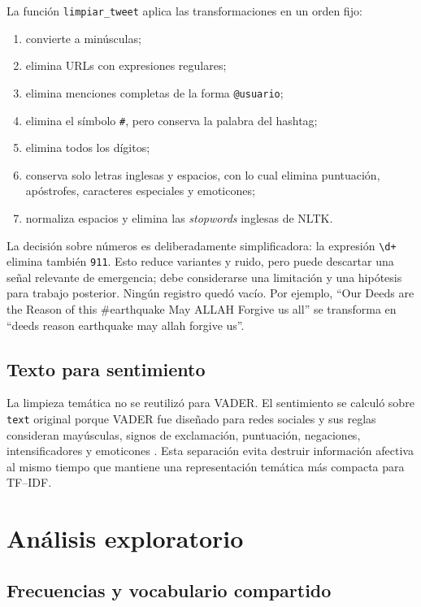\documentclass[11pt,letterpaper]{article}
\newcommand{\code}[1]{\texttt{#1}}
\begin{document}
La función \code{limpiar\_tweet} aplica las transformaciones en un orden fijo:
\begin{enumerate}
  \item convierte a minúsculas;
  \item elimina URLs con expresiones regulares;
  \item elimina menciones completas de la forma \code{@usuario};
  \item elimina el símbolo \code{\#}, pero conserva la palabra del hashtag;
  \item elimina todos los dígitos;
  \item conserva solo letras inglesas y espacios, con lo cual elimina puntuación, apóstrofes, caracteres especiales y emoticones;
  \item normaliza espacios y elimina las \emph{stopwords} inglesas de NLTK.
\end{enumerate}

La decisión sobre números es deliberadamente simplificadora: la expresión \code{\textbackslash d+} elimina también \code{911}. Esto reduce variantes y ruido, pero puede descartar una señal relevante de emergencia; debe considerarse una limitación y una hipótesis para trabajo posterior. Ningún registro quedó vacío. Por ejemplo, ``Our Deeds are the Reason of this \#earthquake May ALLAH Forgive us all'' se transforma en ``deeds reason earthquake may allah forgive us''.

\subsection{Texto para sentimiento}

La limpieza temática no se reutilizó para VADER. El sentimiento se calculó sobre \code{text} original porque VADER fue diseñado para redes sociales y sus reglas consideran mayúsculas, signos de exclamación, puntuación, negaciones, intensificadores y emoticones \cite{hutto2014,nltkvader}. Esta separación evita destruir información afectiva al mismo tiempo que mantiene una representación temática más compacta para TF--IDF.

\section{Análisis exploratorio}

\subsection{Frecuencias y vocabulario compartido}
\end{document}
